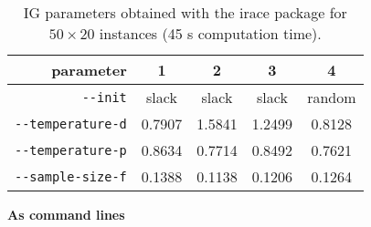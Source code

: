 

\begin{table}[H]
\begin{center}
\caption{IG parameters obtained with the irace package for $50 \times 20$ instances (45 s computation time).}
\label{app:tuning:table/pfsp-ig}
\begin{tabular}{|r|c|c|c|c|}
\hline
\textbf{parameter} & \textbf{1} & \textbf{2} & \textbf{3} & \textbf{4} \\
\hline
\verb!--init! & slack & slack & slack & random\\
\hline
\verb!--temperature-d! & 0.7907 & 1.5841 & 1.2499 & 0.8128\\
\hline
\verb!--temperature-p! & 0.8634 & 0.7714 & 0.8492 & 0.7621\\
\hline
\verb!--sample-size-f! & 0.1388 & 0.1138 & 0.1206 & 0.1264\\
\hline
\end{tabular}
\end{center}
\end{table}

\noindent\textbf{As command lines}








